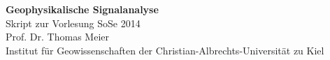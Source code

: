\begin{titlepage}
\begin{center}
\vspace*{2cm}
\Huge
\textbf{Geophysikalische Signalanalyse} \\[2cm]
\LARGE
Skript zur Vorlesung SoSe 2014\\[3cm]
\Large
Prof. Dr. Thomas Meier \\[7cm]
Institut für Geowissenschaften der Christian-Albrechts-Universität zu Kiel
\end{center}
\end{titlepage} 